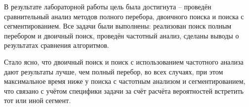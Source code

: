 \Conclusion %
В результате лабораторной работы цель была достигнута -- проведён сравнительный анализ методов полного перебора, двоичного поиска и поиска с сегментированием. Все задачи были выполнены: реализован поиск полным перебором и двоичный поиск, проведён частотный анализ, сделаны выводы о результатах сравнения алгоритмов.
\par Стало ясно, что двоичный поиск и поиск с использованием частотного анализа дают результаты лучше, чем полный перебор, во всех случаях, при этом максимальное время ниже у поиска с частотным анализом и сегментированием, что связано с учётом специфики задачи за счёт расчёта вероятностей встретить тот или иной сегмент.